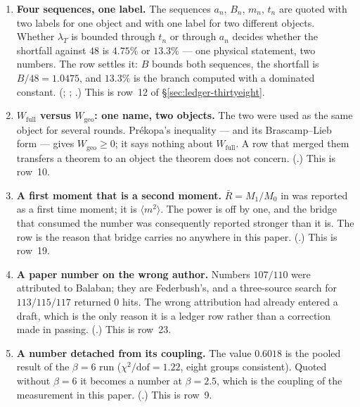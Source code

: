 \begin{enumerate}[label=\textcircled{\small\arabic*},leftmargin=2.3em,itemsep=4pt,topsep=4pt]
\item \textbf{Four sequences, one label.} The sequences $a_n$, $B_n$, $m_n$, $t_n$ are quoted with two
labels for one object and with one label for two different objects. Whether $\lambda_T$ is bounded
through $t_n$ or through $a_n$ decides whether the shortfall against $48$ is $4.75\%$ or $13.3\%$ --- one
physical statement, two numbers. The row settles it: $B$ bounds both sequences, the shortfall is
$B/48=1.0475$, and $13.3\%$ is the branch computed with a dominated constant.
(; ; .) This is row~12 of
\S\ref{sec:ledger-thirtyeight}.

\item \textbf{$W_{\mathrm{full}}$ versus $W_{\mathrm{geo}}$: one name, two objects.} The two were used
as the same object for several rounds. Pr\'ekopa's inequality \cite{prekopa} --- and its
Brascamp--Lieb form \cite{bl} --- gives $W_{\mathrm{geo}}\ge0$; it says
nothing about $W_{\mathrm{full}}$. A row that merged them transfers a theorem to an object the theorem
does not concern. (.) This is row~10.

\item \textbf{A first moment that is a second moment.} $\bar R=M_1/M_0$ in  was reported as a
first time moment; it is $\langle m^2\rangle$. The power is off by one, and the bridge that consumed the
number was consequently reported stronger than it is. The row is the reason that bridge carries no \LT{}
anywhere in this paper. (.) This is row~19.

\item \textbf{A paper number on the wrong author.} Numbers $107/110$ were attributed to Balaban; they
are Federbush's, and a three-source search for $113/115/117$ returned $0$ hits. The wrong attribution had
already entered a draft, which is the only reason it is a ledger row rather than a correction made in
passing. (.) This is row~23.

\item \textbf{A number detached from its coupling.} The value $0.6018$ is the pooled result of the
$\beta=6$ run ($\chi^2/\mathrm{dof}=1.22$, eight groups consistent). Quoted without $\beta=6$ it becomes
a number at $\beta=2.5$, which is the coupling of the measurement in this paper.
(.) This is row~9.
\end{enumerate}


